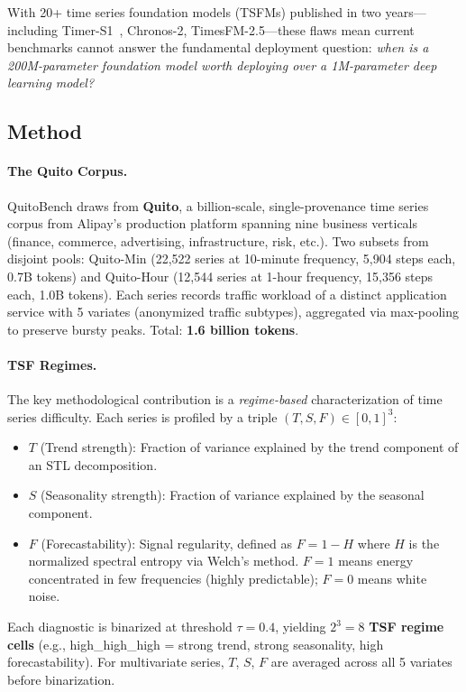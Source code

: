 \documentclass[11pt]{article}
\begin{document}
With 20+ time series foundation models (TSFMs) published in two years---including Timer-S1~\cite{timers1}, Chronos-2, TimesFM-2.5---these flaws mean current benchmarks cannot answer the fundamental deployment question: \textit{when is a 200M-parameter foundation model worth deploying over a 1M-parameter deep learning model?}

\subsection{Method}

\paragraph{The Quito Corpus.}
QuitoBench draws from \textbf{Quito}, a billion-scale, single-provenance time series corpus from Alipay's production platform spanning nine business verticals (finance, commerce, advertising, infrastructure, risk, etc.). Two subsets from disjoint pools: Quito-Min (22,522 series at 10-minute frequency, 5,904 steps each, 0.7B tokens) and Quito-Hour (12,544 series at 1-hour frequency, 15,356 steps each, 1.0B tokens). Each series records traffic workload of a distinct application service with 5 variates (anonymized traffic subtypes), aggregated via max-pooling to preserve bursty peaks. Total: \textbf{1.6 billion tokens}.

\paragraph{TSF Regimes.}
The key methodological contribution is a \textit{regime-based} characterization of time series difficulty. Each series is profiled by a triple $(T, S, F) \in [0,1]^3$:
\begin{itemize}
    \item $T$ (Trend strength): Fraction of variance explained by the trend component of an STL decomposition.
    \item $S$ (Seasonality strength): Fraction of variance explained by the seasonal component.
    \item $F$ (Forecastability): Signal regularity, defined as $F = 1 - H$ where $H$ is the normalized spectral entropy via Welch's method. $F=1$ means energy concentrated in few frequencies (highly predictable); $F=0$ means white noise.
\end{itemize}
Each diagnostic is binarized at threshold $\tau = 0.4$, yielding $2^3 = 8$ \textbf{TSF regime cells} (e.g., high\_high\_high = strong trend, strong seasonality, high forecastability). For multivariate series, $T$, $S$, $F$ are averaged across all 5 variates before binarization.
\end{document}
